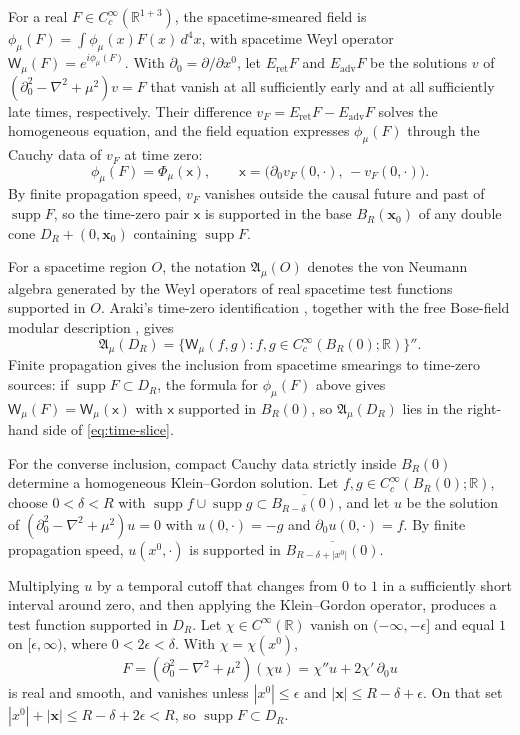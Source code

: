 \documentclass[11pt]{amsart}
\numberwithin{equation}{section}
\theoremstyle{definition}
\newcommand{\A}{\mathfrak A}
\newcommand{\R}{\mathbb R}
\newcommand{\sx}{\mathsf x}
\newcommand{\bx}{\mathbf x}
\newcommand{\supp}{\operatorname{supp}}
\begin{document}
For a real \(F\in C_c^\infty(\R^{1+3})\), the spacetime-smeared field
is \(\phi_\mu(F)=\int\phi_\mu(x)F(x)\,d^4x\), with spacetime Weyl
operator \(\mathsf W_\mu(F)=e^{i\phi_\mu(F)}\). With
\(\partial_0=\partial/\partial x^0\), let \(E_{\mathrm{ret}}F\) and
\(E_{\mathrm{adv}}F\) be the solutions \(v\) of
\((\partial_0^2-\nabla^2+\mu^2)v=F\) that vanish at all sufficiently
early and at all sufficiently late times, respectively. Their difference
\(v_F=E_{\mathrm{ret}}F-E_{\mathrm{adv}}F\) solves the homogeneous
equation, and the field equation expresses \(\phi_\mu(F)\) through the
Cauchy data of \(v_F\) at time zero:
\[
 \phi_\mu(F)=\Phi_\mu(\sx),\qquad
 \sx=\bigl(\partial_0v_F(0,\cdot),\,-v_F(0,\cdot)\bigr).
\]
By finite propagation speed, \(v_F\) vanishes outside the causal future
and past of \(\supp F\), so the time-zero pair \(\sx\) is supported in
the base \(B_R(\bx_0)\) of any double cone \(D_R+(0,\bx_0)\) containing
\(\supp F\).

For a spacetime region \(O\), the notation \(\A_\mu(O)\) denotes the von
Neumann algebra generated by the Weyl operators of real spacetime test
functions supported in \(O\). Araki's time-zero identification
\cite{Araki64}, together with the free Bose-field modular description
\cite{EO73}, gives
\begin{equation}
 \A_\mu(D_R)
 =\{\mathsf W_\mu(f,g):f,g\in C_c^\infty(B_R(0);\R)\}''.
 \label{eq:time-slice}
\end{equation}
Finite propagation gives the inclusion from spacetime smearings to
time-zero sources: if \(\supp F\subset D_R\), the formula for
\(\phi_\mu(F)\) above gives \(\mathsf W_\mu(F)=\mathsf W_\mu(\sx)\) with
\(\sx\) supported in \(B_R(0)\), so \(\A_\mu(D_R)\) lies in the
right-hand side of \eqref{eq:time-slice}.

For the converse inclusion, compact Cauchy data strictly inside \(B_R(0)\) determine a
homogeneous Klein--Gordon solution. Let \(f,g\in C_c^\infty(B_R(0);\R)\),
choose \(0<\delta<R\) with
\(\supp f\cup\supp g\subset\overline{B_{R-\delta}(0)}\), and let \(u\)
be the solution of \((\partial_0^2-\nabla^2+\mu^2)u=0\) with
\(u(0,\cdot)=-g\) and \(\partial_0u(0,\cdot)=f\). By finite propagation
speed, \(u(x^0,\cdot)\) is supported in
\(\overline{B_{R-\delta+|x^0|}(0)}\).

Multiplying \(u\) by a temporal cutoff that changes from \(0\) to \(1\) in
a sufficiently short interval around zero, and then applying the
Klein--Gordon operator, produces a test function supported in \(D_R\). Let
\(\chi\in C^\infty(\R)\) vanish on \((-\infty,-\epsilon]\) and equal
\(1\) on \([\epsilon,\infty)\), where \(0<2\epsilon<\delta\). With
\(\chi=\chi(x^0)\),
\[
 F=(\partial_0^2-\nabla^2+\mu^2)(\chi u)=\chi''u+2\chi'\,\partial_0u
\]
is real and smooth, and vanishes unless \(|x^0|\le\epsilon\) and
\(|\bx|\le R-\delta+\epsilon\). On that set
\(|x^0|+|\bx|\le R-\delta+2\epsilon<R\), so \(\supp F\subset D_R\).
\end{document}
